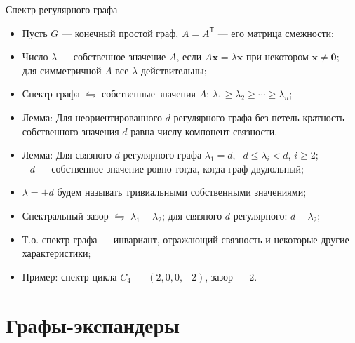 \documentclass[serif, aspectratio=169]{beamer}
\begin{document}
\begin{frame}{Спектр регулярного графа}
    \begin{itemize}
        \item Пусть $G$ --- конечный простой граф, $A=A^{\mathsf T}$ --- его матрица смежности;
        \item Число $\lambda$ --- собственное значение $A$, если $A\mathbf{x}=\lambda \mathbf{x}$ при некотором $\mathbf{x}\ne\mathbf{0}$;\\
        для симметричной $A$ все $\lambda$ действительны;
        \item Спектр графа $\leftrightharpoons$ собственные значения $A$: $\lambda_1\ge\lambda_2\ge\cdots\ge\lambda_n$;
        \item Лемма: Для неориентированного $d$-регулярного графа без петель кратность собственного значения $d$ равна числу компонент связности.
        \item Лемма: Для связного $d$-регулярного графа $\lambda_1=d$,\quad $-d\le\lambda_i<d$, $i\ge2$;\\
        $-d$ --- собственное значение ровно тогда, когда граф двудольный;
        \item $\lambda=\pm d$ будем называть тривиальными собственными значениями;
        \item Спектральный зазор $\leftrightharpoons$ $\lambda_1-\lambda_2$; для связного $d$-регулярного: $d-\lambda_2$;
        \item Т.о. спектр графа --- инвариант, отражающий связность и некоторые другие характеристики;
        \item Пример: спектр цикла $C_4$ --- $(2,0,0,-2)$, зазор --- $2$.
    \end{itemize}
    \note{
        \begin{itemize}
            \item ---
        \end{itemize}
    }
\end{frame}

\section{Графы-экспандеры}
\end{document}
